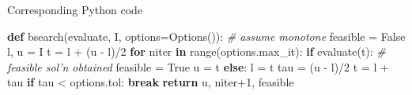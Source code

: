 \documentclass[10pt,ignorenonframetext,serif,onlymath]{beamer}
\newenvironment{Shaded}{}{}
\newcommand{\BuiltInTok}[1]{#1}
\newcommand{\CommentTok}[1]{\textcolor[rgb]{0.38,0.63,0.69}{\textit{#1}}}
\newcommand{\ControlFlowTok}[1]{\textcolor[rgb]{0.00,0.44,0.13}{\textbf{#1}}}
\newcommand{\DecValTok}[1]{\textcolor[rgb]{0.25,0.63,0.44}{#1}}
\newcommand{\KeywordTok}[1]{\textcolor[rgb]{0.00,0.44,0.13}{\textbf{#1}}}
\newcommand{\NormalTok}[1]{#1}
\newcommand{\OperatorTok}[1]{\textcolor[rgb]{0.40,0.40,0.40}{#1}}
\newcommand{\VariableTok}[1]{\textcolor[rgb]{0.10,0.09,0.49}{#1}}
\begin{document}
\begin{frame}[fragile]{Corresponding Python code}
\protect\hypertarget{corresponding-python-code-1}{}

\begin{Shaded}
\begin{Highlighting}[]
\KeywordTok{def}\NormalTok{ bsearch(evaluate, I, options}\OperatorTok{=}\NormalTok{Options()):}
    \CommentTok{# assume monotone}
\NormalTok{    feasible }\OperatorTok{=} \VariableTok{False}
\NormalTok{    l, u }\OperatorTok{=}\NormalTok{ I}
\NormalTok{    t }\OperatorTok{=}\NormalTok{ l }\OperatorTok{+}\NormalTok{ (u }\OperatorTok{-}\NormalTok{ l)}\OperatorTok{/}\DecValTok{2}
    \ControlFlowTok{for}\NormalTok{ niter }\KeywordTok{in} \BuiltInTok{range}\NormalTok{(options.max_it):}
        \ControlFlowTok{if}\NormalTok{ evaluate(t):  }\CommentTok{# feasible sol'n obtained}
\NormalTok{            feasible }\OperatorTok{=} \VariableTok{True}
\NormalTok{            u }\OperatorTok{=}\NormalTok{ t}
        \ControlFlowTok{else}\NormalTok{:}
\NormalTok{            l }\OperatorTok{=}\NormalTok{ t}
\NormalTok{        tau }\OperatorTok{=}\NormalTok{ (u }\OperatorTok{-}\NormalTok{ l)}\OperatorTok{/}\DecValTok{2}
\NormalTok{        t }\OperatorTok{=}\NormalTok{ l }\OperatorTok{+}\NormalTok{ tau}
        \ControlFlowTok{if}\NormalTok{ tau }\OperatorTok{<}\NormalTok{ options.tol:}
            \ControlFlowTok{break}
    \ControlFlowTok{return}\NormalTok{ u, niter}\OperatorTok{+}\DecValTok{1}\NormalTok{, feasible}
\end{Highlighting}
\end{Shaded}

\end{frame}
\end{document}
